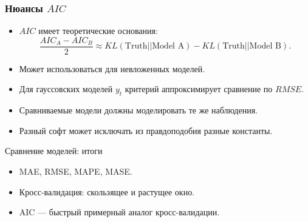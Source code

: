 \begin{frame}
    \frametitle{Нюансы $AIC$}

    \begin{itemize}[<+->]
        \item $AIC$ имеет \alert{теоретические основания}:
        \[
            \frac{AIC_A - AIC_B}{2} \approx KL(\text{Truth} || \text{Model A}) - KL(\text{Truth} || \text{Model B}).
        \]
        \item Может использоваться \alert{для невложенных моделей}. 
        \item Для гауссовских моделей $y_t$ критерий аппроксимирует \alert{сравнение по $RMSE$}.
        \item Сравниваемые модели должны моделировать \alert{те же} наблюдения. 
        \item Разный софт может исключать из правдоподобия \alert{разные константы}. 
    \end{itemize}

    

\end{frame}


\begin{frame}{Сравнение моделей: итоги}

  \begin{itemize}[<+->]
    \item MAE, RMSE, MAPE, MASE.
    \item Кросс-валидация: скользящее и растущее окно.
    \item AIC — быстрый примерный аналог кросс-валидации. 
  \end{itemize}
\end{frame}



